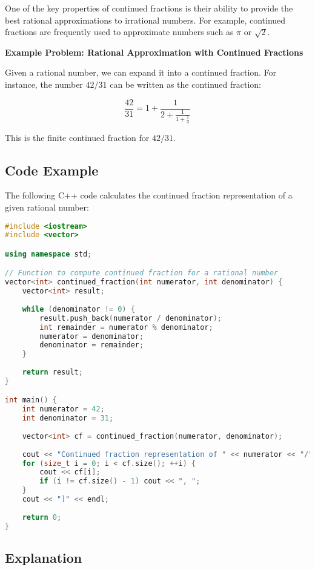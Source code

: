 \documentclass[10pt,a4paper]{article}
\begin{document}
One of the key properties of continued fractions is their ability to provide the best rational approximations to irrational numbers. For example, continued fractions are frequently used to approximate numbers such as \(\pi\) or \(\sqrt{2}\).

\textbf{Example Problem: Rational Approximation with Continued Fractions}

Given a rational number, we can expand it into a continued fraction. For instance, the number \(42/31\) can be written as the continued fraction:

\[
\frac{42}{31} = 1 + \frac{1}{2 + \frac{1}{1 + \frac{1}{4}}}
\]

This is the finite continued fraction for \(42/31\).

\subsection*{Code Example}

The following C++ code calculates the continued fraction representation of a given rational number:

\begin{lstlisting}[language=C++]
#include <iostream>
#include <vector>

using namespace std;

// Function to compute continued fraction for a rational number
vector<int> continued_fraction(int numerator, int denominator) {
    vector<int> result;
    
    while (denominator != 0) {
        result.push_back(numerator / denominator);
        int remainder = numerator % denominator;
        numerator = denominator;
        denominator = remainder;
    }
    
    return result;
}

int main() {
    int numerator = 42;
    int denominator = 31;
    
    vector<int> cf = continued_fraction(numerator, denominator);
    
    cout << "Continued fraction representation of " << numerator << "/" << denominator << " is: [";
    for (size_t i = 0; i < cf.size(); ++i) {
        cout << cf[i];
        if (i != cf.size() - 1) cout << ", ";
    }
    cout << "]" << endl;
    
    return 0;
}
\end{lstlisting}

\subsection*{Explanation}
\end{document}
